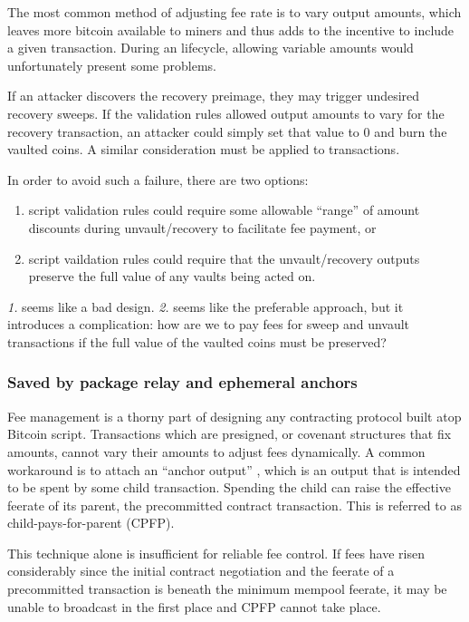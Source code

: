 \documentclass[10pt]{article}
\begin{document}
The most common method of adjusting fee rate is to vary output
amounts, which leaves more bitcoin available to miners and thus adds to the
incentive to include a given transaction.
During an \opv{} lifecycle, allowing variable amounts would unfortunately
present some problems.

If an attacker discovers the recovery preimage, they may trigger undesired recovery
sweeps. If the \opv{} validation rules allowed output amounts to vary for the recovery
transaction, an attacker could simply set that value to 0 and burn the vaulted coins. 
A similar consideration must be applied to \opuv{} transactions.

In order to avoid such a failure, there are two options:

\begin{enumerate}
  \item script validation rules could require some allowable ``range'' of
    amount discounts during unvault/recovery to facilitate fee payment, or

  \item script vaildation rules could require that the unvault/recovery
    outputs preserve the full value of any vaults being acted on. 

\end{enumerate}
\emph{1.} seems like a bad design. \emph{2.} seems like the preferable approach, but it
introduces a complication: how are we to pay fees for sweep and
unvault transactions if the full value of the vaulted coins must be preserved?

\subsubsection*{Saved by package relay and ephemeral anchors}

Fee management is a thorny part of designing any contracting protocol built atop
Bitcoin script. Transactions which are presigned, or covenant structures that fix
amounts, cannot vary their amounts to adjust fees dynamically. A common workaround is
to attach an ``anchor output'' \cite{OptechAnchors}, which is an output that is
intended to be spent by some child transaction. Spending the child can raise the
effective feerate of its parent, the precommitted contract transaction. This is
referred to as child-pays-for-parent (CPFP).

This technique alone is insufficient for reliable fee control. If fees have risen
considerably since the initial contract negotiation and the feerate of a precommitted
transaction is beneath the minimum mempool feerate, it may be unable to broadcast in
the first place and CPFP cannot take place.
\end{document}
